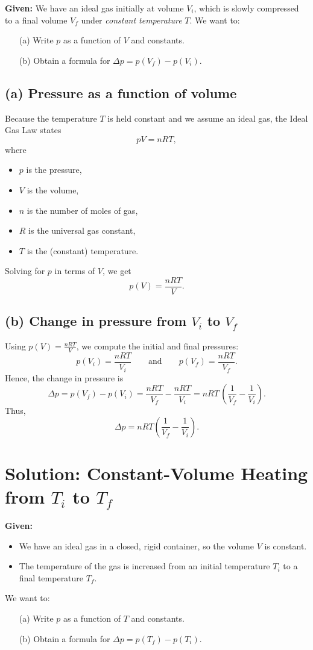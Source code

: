 \documentclass[12pt]{article}
\theoremstyle{definition} %
\theoremstyle{plain} %
\begin{document}
\noindent
\textbf{Given:} We have an ideal gas initially at volume $V_i$, which is slowly compressed to a final volume $V_f$ under \emph{constant temperature} $T$. 
We want to:
\begin{enumerate}
    \item[(a)] Write $p$ as a function of $V$ and constants.
    \item[(b)] Obtain a formula for $\Delta p = p(V_f) - p(V_i)$.
\end{enumerate}

\subsection*{(a) Pressure as a function of volume}

\noindent
Because the temperature $T$ is held constant and we assume an ideal gas, the Ideal Gas Law states
\[
pV = nRT,
\]
where 
\begin{itemize}
    \item $p$ is the pressure,
    \item $V$ is the volume,
    \item $n$ is the number of moles of gas,
    \item $R$ is the universal gas constant,
    \item $T$ is the (constant) temperature.
\end{itemize}

\noindent
Solving for $p$ in terms of $V$, we get
\[
\boxed{p(V) = \frac{nRT}{V}.}
\]

\subsection*{(b) Change in pressure from $V_i$ to $V_f$}

\noindent
Using $p(V) = \tfrac{nRT}{V}$, we compute the initial and final pressures:
\[
p(V_i) = \frac{nRT}{V_i}
\quad\quad\text{and}\quad\quad
p(V_f) = \frac{nRT}{V_f}.
\]
Hence, the change in pressure is
\[
\Delta p = p(V_f) - p(V_i)
= \frac{nRT}{V_f} - \frac{nRT}{V_i}
= nRT \,\left(\frac{1}{V_f} - \frac{1}{V_i}\right).
\]
Thus,
\[
\boxed{\Delta p
= nRT\left(\frac{1}{V_f} - \frac{1}{V_i}\right).
}
\]

\section*{Solution: Constant-Volume Heating from $T_i$ to $T_f$}

\noindent
\textbf{Given:}
\begin{itemize}
    \item We have an ideal gas in a closed, rigid container, so the volume $V$ is constant.
    \item The temperature of the gas is increased from an initial temperature $T_i$ to a final temperature $T_f$.
\end{itemize}
We want to:
\begin{enumerate}
    \item[(a)] Write $p$ as a function of $T$ and constants.
    \item[(b)] Obtain a formula for $\Delta p = p(T_f) - p(T_i)$.
\end{enumerate}
\end{document}
